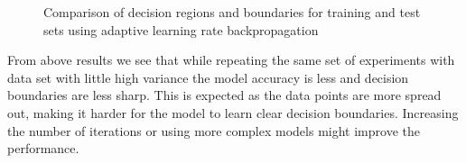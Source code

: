 \documentclass[a4paper,12pt]{article}
\begin{document}
\begin{figure}[H]
        \caption{Comparison of decision regions and boundaries for training and test sets using adaptive learning rate backpropagation}
\end{figure}

 From above results we see that while repeating the same set of experiments with data set with little high variance the model accuracy is less  
 and decision boundaries are less sharp. This is expected as the data points are more spread out, making it harder 
 for the model to learn clear decision boundaries. Increasing the number of iterations or using more complex models might improve the performance.
\end{document}
